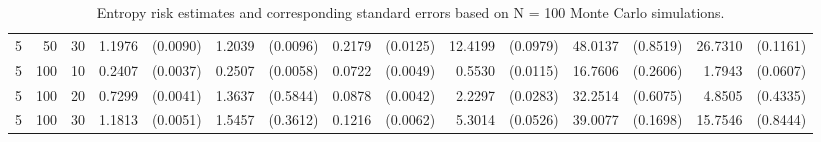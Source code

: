 \begin{table}[ht]
\begin{small}
\begin{tabular}{lrrrrrrrrrrrrrr}
  5 & 50 & 30 & 1.1976 & (0.0090) & 1.2039 & (0.0096) & 0.2179 & (0.0125) & 12.4199 & (0.0979) & 48.0137 & (0.8519) & 26.7310 & (0.1161) \\ 
  5 & 100 & 10 & 0.2407 & (0.0037) & 0.2507 & (0.0058) & 0.0722 & (0.0049) & 0.5530 & (0.0115) & 16.7606 & (0.2606) & 1.7943 & (0.0607) \\ 
  5 & 100 & 20 & 0.7299 & (0.0041) & 1.3637 & (0.5844) & 0.0878 & (0.0042) & 2.2297 & (0.0283) & 32.2514 & (0.6075) & 4.8505 & (0.4335) \\ 
  5 & 100 & 30 & 1.1813 & (0.0051) & 1.5457 & (0.3612) & 0.1216 & (0.0062) & 5.3014 & (0.0526) & 39.0077 & (0.1698) & 15.7546 & (0.8444) \\ 
   \hline
\end{tabular}
\end{small}
\caption{Entropy risk estimates and corresponding standard errors based on N = 100 Monte Carlo simulations.} 
\end{table}
